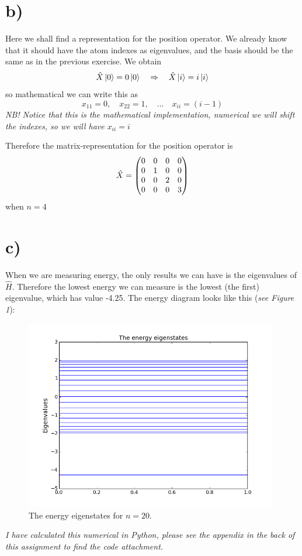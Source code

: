 \documentclass{scrartcl}
\begin{document}
\section*{b)}
Here we shall find a representation for the position operator. We already know that it should have the atom indexes as eigenvalues, and the basis should be the same as in the previous exercise. We obtain
$$\hat{X}\ket{0}=0\ket{0}\quad\Rightarrow\quad\hat{X}\ket{i}=i\ket{i}$$
so mathematical we can write this as
$$x_{11}=0,\quad x_{22}=1,\quad ...\quad x_{ii}=(i-1)$$
\textit{NB! Notice that this is the mathematical implementation, numerical we will shift the indexes, so we will have $x_{ii}=i$}\par\vspace{3mm}
Therefore the matrix-representation for the position operator is
$$\hat{X}=\mqty(0&0&0&0\\0&1&0&0\\0&0&2&0\\0&0&0&3)$$
when $n=4$

\section*{c)}
When we are measuring energy, the only results we can have is the eigenvalues of $\hat{H}$. Therefore the lowest energy we can measure is the lowest (the first) eigenvalue, which has value -4.25. The energy diagram looks like this (\textit{see Figure 1}):
\begin{figure}[!htbp]
\centering
\includegraphics[width=110mm]{oblig3_1.png}
\caption{The energy eigenstates for $n=20$. \label{overflow}}
\end{figure}
\textit{I have calculated this numerical in Python, please see the appendix in the back of this assignment to find the code attachment.}
\end{document}
